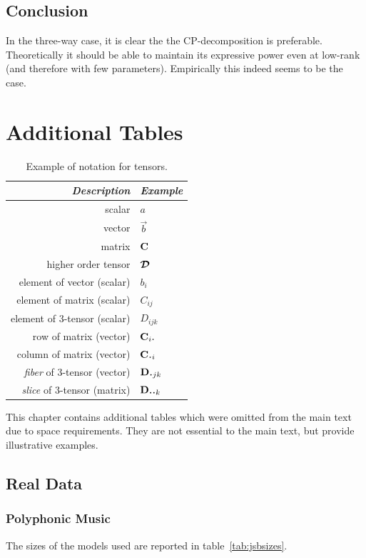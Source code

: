 \section{Conclusion}
In the three-way case, it is clear the the CP-decomposition is preferable. Theoretically it should
be able to maintain its expressive power even at low-rank (and therefore with few parameters).
Empirically this indeed seems to be the case. 

\chapter{Additional Tables}
\begin{table}[h]
\centering
\begin{tabu} to 0.5\linewidth {|r|l|}
\hline 
\textit{Description} & \textit{Example} \\
\hline
scalar & \(a\) \\
vector & \(\vec{b}\) \\
matrix & \(\mathbf{C}\) \\
higher order tensor & \(\bm{\mathcal{D}}\) \\
element of vector (scalar) & \(b_i\) \\
element of matrix (scalar) & \(C_{ij}\) \\
element of 3-tensor (scalar) & \(D_{ijk}\) \\
row of matrix (vector) & \(\vec{C}_{i\midbullet}\) \\
column of matrix (vector) & \(\vec{C}_{\midbullet i}\)\\
\textit{fiber} of 3-tensor (vector) & \(\vec{D}_{\midbullet jk}\)\\
\textit{slice} of 3-tensor (matrix) & \(\mat{D}_{\midbullet\midbullet k}\)\\
\hline
\end{tabu}
\caption{Example of notation for tensors.}
\label{tab:notation}
\end{table}

This chapter contains additional tables which were omitted from the main text due to space
requirements. They are not essential to the main text, but provide illustrative examples.

\section{Real Data}

\subsection{Polyphonic Music}
The sizes of the models used are reported in table~\ref{tab:jsbsizes}.


